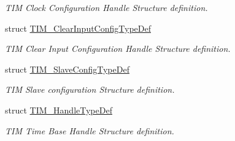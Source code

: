 \begin{DoxyCompactItemize}
\begin{DoxyCompactList}\small\item\em T\+IM Clock Configuration Handle Structure definition. \end{DoxyCompactList}\item 
struct \hyperlink{struct_t_i_m___clear_input_config_type_def}{T\+I\+M\+\_\+\+Clear\+Input\+Config\+Type\+Def}
\begin{DoxyCompactList}\small\item\em T\+IM Clear Input Configuration Handle Structure definition. \end{DoxyCompactList}\item 
struct \hyperlink{struct_t_i_m___slave_config_type_def}{T\+I\+M\+\_\+\+Slave\+Config\+Type\+Def}
\begin{DoxyCompactList}\small\item\em T\+IM Slave configuration Structure definition. \end{DoxyCompactList}\item 
struct \hyperlink{struct_t_i_m___handle_type_def}{T\+I\+M\+\_\+\+Handle\+Type\+Def}
\begin{DoxyCompactList}\small\item\em T\+IM Time Base Handle Structure definition. \end{DoxyCompactList}\end{DoxyCompactItemize}
